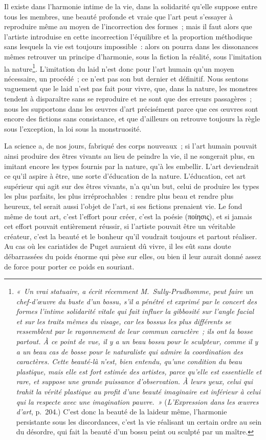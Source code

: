 \documentclass[french,twoside]{book} %
\begin{document}
Il existe dans l’harmonie intime de la vie, dans la solidarité qu’elle suppose entre tous les membres, une beauté profonde et vraie que l’art peut s’essayer à reproduire même au moyen de l’incorrection des formes ; mais il faut alors que l’artiste introduise en cette incorrection l’équilibre et la proportion méthodique sans lesquels la vie est toujours impossible : alors on pourra dans les dissonances mêmes retrouver un principe d’harmonie, sous la fiction la réalité, sous l’imitation la nature\footnote{\emph{« Un vrai statuaire, a écrit récemment M. Sully-Prudhomme, peut faire un chef-d’œuvre du buste d’un bossu, s’il a pénétré et exprimé par le concert des formes l’intime \emph{solidarité} vitale qui fait influer la gibbosité sur l’angle facial et sur les traits mêmes du visage, car les bossus les plus différents se ressemblent par le rayonnement de leur commun caractère ; ils ont la bosse partout. À ce point de vue, il y a un beau bossu pour le sculpteur, comme il y a un beau cas de bosse pour le naturaliste qui admire la \emph{coordination} des caractères. Cette beauté-là n’est, bien entendu, qu’une condition du beau plastique, mais elle est fort estimée des artistes, parce qu’elle est essentielle et rare, et suppose une grande puissance d’observation. À leurs yeux, celui qui trahit la vérité plastique au profit d’une beauté imaginaire est inférieur à celui qui la respecte avec une imagination pauvre. »} (\emph{L’Expression dans les œuvres d’art}, p. 204.) C’est donc la beauté de la laideur même, l’harmonie persistante sous les discordances, c’est la vie réalisant un certain ordre au sein du désordre, qui fait la beauté d’un bossu peint ou sculpté par un maître.}. L’imitation du laid n’est donc pour l’art humain qu’un moyen nécessaire, un procédé ; ce n’est pas son but dernier et définitif. Nous sentons vaguement que le laid n’est pas fait pour vivre, que, dans la nature, les monstres tendent à disparaître sans se reproduire et ne sont que des erreurs  passagères ; nous les supportons dans les œuvres d’art précisément parce que ces œuvres sont encore des fictions sans consistance, et que d’ailleurs on retrouve toujours la règle sous l’exception, la loi sous la monstruosité.\par
La science a, de nos jours, fabriqué des corps nouveaux ; si l’art humain pouvait ainsi produire des êtres vivants au lieu de peindre la vie, il ne songerait plus, en imitant encore les types fournis par la nature, qu’à les embellir. L’art deviendrait ce qu’il aspire à être, une sorte d’éducation de la nature. L’éducation, cet art supérieur qui agit sur des êtres vivants, n’a qu’un but, celui de produire les types les plus parfaits, les plus irréprochables : rendre plus beau et rendre plus heureux, tel serait aussi l’objet de l’art, si ses fictions prenaient vie. Le fond même de tout art, c’est l’effort pour créer, c’est la poésie (ποίησις), et si jamais cet effort pouvait entièrement réussir, si l’artiste pouvait être un véritable créateur, c’est la beauté et le bonheur qu’il voudrait toujours et partout réaliser. Au cas où les cariatides de Puget auraient dû vivre, il les eût sans doute débarrassées du poids énorme qui pèse sur elles, ou bien il leur aurait donné assez de force pour porter ce poids en souriant.\par
\end{document}
